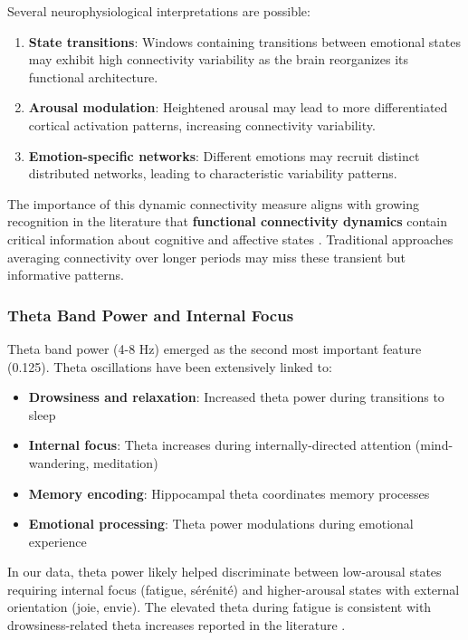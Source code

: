 Several neurophysiological interpretations are possible:

\begin{enumerate}
    \item \textbf{State transitions}: Windows containing transitions between emotional states may exhibit high connectivity variability as the brain reorganizes its functional architecture.
    \item \textbf{Arousal modulation}: Heightened arousal may lead to more differentiated cortical activation patterns, increasing connectivity variability.
    \item \textbf{Emotion-specific networks}: Different emotions may recruit distinct distributed networks, leading to characteristic variability patterns.
\end{enumerate}

The importance of this dynamic connectivity measure aligns with growing recognition in the literature that \textbf{functional connectivity dynamics} contain critical information about cognitive and affective states \cite{liu2024graph_eeg_emotion}. Traditional approaches averaging connectivity over longer periods may miss these transient but informative patterns.

\subsubsection{Theta Band Power and Internal Focus}

Theta band power (4-8 Hz) emerged as the second most important feature (0.125). Theta oscillations have been extensively linked to:

\begin{itemize}
    \item \textbf{Drowsiness and relaxation}: Increased theta power during transitions to sleep
    \item \textbf{Internal focus}: Theta increases during internally-directed attention (mind-wandering, meditation)
    \item \textbf{Memory encoding}: Hippocampal theta coordinates memory processes
    \item \textbf{Emotional processing}: Theta power modulations during emotional experience
\end{itemize}

In our data, theta power likely helped discriminate between low-arousal states requiring internal focus (fatigue, sérénité) and higher-arousal states with external orientation (joie, envie). The elevated theta during fatigue is consistent with drowsiness-related theta increases reported in the literature \cite{dhuli2022tutorial}.

